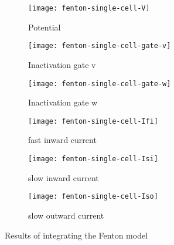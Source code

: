 \begin{figure}[h]
    \centering
    \begin{subfigure}[b]{.3\textwidth}
        \texttt{[image: fenton-single-cell-V]}
        \vspace{-\baselineskip}
        \label{fig:fenton1-V}
        \caption{Potential}
    \end{subfigure}
    \vspace{\baselineskip}
    \begin{subfigure}[b]{.3\textwidth}
        \texttt{[image: fenton-single-cell-gate-v]}
        \vspace{-\baselineskip}
        \label{fig:fenton1-v}
        \caption{Inactivation gate v}
    \end{subfigure}
    \begin{subfigure}[b]{.3\textwidth}
        \texttt{[image: fenton-single-cell-gate-w]}
        \vspace{-\baselineskip}
        \label{fig:fenton1-w}
        \caption{Inactivation gate w}
    \end{subfigure}
    \begin{subfigure}[b]{.3\textwidth}
        \texttt{[image: fenton-single-cell-Ifi]}
        \vspace{-\baselineskip}
        \label{fig:fenton1-Ifi}
        \caption{fast inward current}
    \end{subfigure}
    \begin{subfigure}[b]{.3\textwidth}
        \texttt{[image: fenton-single-cell-Isi]}
        \vspace{-\baselineskip}
        \label{fig:fenton1-Isi}
        \caption{slow inward current}
    \end{subfigure}
    \begin{subfigure}[b]{.3\textwidth}
        \texttt{[image: fenton-single-cell-Iso]}
        \vspace{-\baselineskip}
        \label{fig:fenton1-Iso}
        \caption{slow outward current}
    \end{subfigure}
    \label{fig:fenton1}
    \caption{Results of integrating the Fenton model}
\end{figure}

